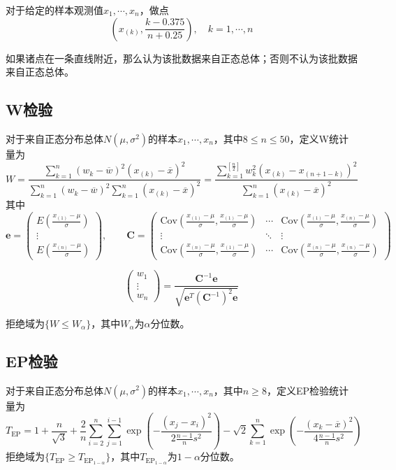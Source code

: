 \documentclass[lang = cn, scheme = chinese, thmcnt = section]{elegantbook}
\newcommand{\dis}{\displaystyle}
\begin{document}
对于给定的样本观测值$x_1,\cdots,x_n$，做点
$$
\left( x_{(k)},\frac{k-0.375}{n+0.25} \right),\quad k=1,\cdots,n
$$

如果诸点在一条直线附近，那么认为该批数据来自正态总体；否则不认为该批数据来自正态总体。

\subsection{W检验}

对于来自正态分布总体$N(\mu,\sigma^2)$的样本$x_1,\cdots,x_n$，其中$8\le n\le 50$，定义W统计量为
$$
W=\frac{\dis\sum_{k=1}^{n}{(w_k-\overline{w})^2(x_{(k)}-\overline{x})^2}}
{\dis\sum_{k=1}^{n}{(w_k-\overline{w})^2}\sum_{k=1}^{n}(x_{(k)}-\overline{x})^2}=
\frac{\dis\sum_{k=1}^{[\frac{n}{2}]}{w_k^2(x_{(k)}-x_{(n+1-k)})^2}}{\dis\sum_{k=1}^{n}{(x_{(k)}-\overline{x})^2}}
$$
其中
$$
\boldsymbol{e}=\begin{pmatrix}
	E\left( \frac{x_{(1)}-\mu}{\sigma} \right)\\
	\vdots\\
	E\left( \frac{x_{(n)}-\mu}{\sigma} \right)
\end{pmatrix},\qquad
\boldsymbol{C}=\begin{pmatrix}
	\mathrm{Cov}\left( \frac{x_{(1)}-\mu}{\sigma},\frac{x_{(1)}-\mu}{\sigma} \right)&\cdots&\mathrm{Cov}\left( \frac{x_{(1)}-\mu}{\sigma},\frac{x_{(n)}-\mu}{\sigma} \right)\\
	\vdots&\ddots&\vdots\\
	\mathrm{Cov}\left( \frac{x_{(n)}-\mu}{\sigma},\frac{x_{(1)}-\mu}{\sigma} \right)&\cdots&\mathrm{Cov}\left( \frac{x_{(n)}-\mu}{\sigma},\frac{x_{(n)}-\mu}{\sigma} \right)
\end{pmatrix}
$$

$$
\begin{pmatrix}
	w_1\\\vdots\\w_n
\end{pmatrix}=\frac{\boldsymbol{C}^{-1}\boldsymbol{e}}{\sqrt{\boldsymbol{e}^T (\boldsymbol{C}^{-1})^2 \boldsymbol{e}}}
$$

拒绝域为$\{ W\le W_{\alpha} \}$，其中$W_\alpha$为$\alpha$分位数。

\subsection{EP检验}

对于来自正态分布总体$N(\mu,\sigma^2)$的样本$x_1,\cdots,x_n$，其中$n\ge 8$，定义EP检验统计量为
$$
T_{\mathrm{EP}}=1+\frac{n}{\sqrt{3}}+\frac{2}{n}\sum_{i=2}^{n}\sum_{j=1}^{i-1}\exp\left(-\frac{(x_j-x_i)^2}{2\frac{n-1}{n}s^2}\right)-\sqrt{2}\sum_{k=1}^{n}\exp\left(-\frac{(x_k-\overline{x})^2}{4\frac{n-1}{n}s^2}\right)
$$
拒绝域为$\{ T_{\mathrm{EP}}\ge T_{{\mathrm{EP}}_{1-\alpha}} \}$，其中$T_{{\mathrm{EP}}_{1-\alpha}}$为$1-\alpha$分位数。
\end{document}
